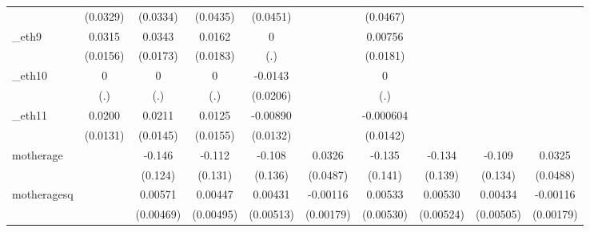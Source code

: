 \begin{table}[htbp]
\begin{tabular}{l*{9}{c}}
            &    (0.0329)         &    (0.0334)         &    (0.0435)         &    (0.0451)         &                     &    (0.0467)         &                     &                     &                     \\
[1em]
\_eth9       &      0.0315\sym{**} &      0.0343\sym{**} &      0.0162         &           0         &                     &     0.00756         &                     &                     &                     \\
            &    (0.0156)         &    (0.0173)         &    (0.0183)         &         (.)         &                     &    (0.0181)         &                     &                     &                     \\
[1em]
\_eth10      &           0         &           0         &           0         &     -0.0143         &                     &           0         &                     &                     &                     \\
            &         (.)         &         (.)         &         (.)         &    (0.0206)         &                     &         (.)         &                     &                     &                     \\
[1em]
\_eth11      &      0.0200         &      0.0211         &      0.0125         &    -0.00890         &                     &   -0.000604         &                     &                     &                     \\
            &    (0.0131)         &    (0.0145)         &    (0.0155)         &    (0.0132)         &                     &    (0.0142)         &                     &                     &                     \\
[1em]
motherage   &                     &      -0.146         &      -0.112         &      -0.108         &      0.0326         &      -0.135         &      -0.134         &      -0.109         &      0.0325         \\
            &                     &     (0.124)         &     (0.131)         &     (0.136)         &    (0.0487)         &     (0.141)         &     (0.139)         &     (0.134)         &    (0.0488)         \\
[1em]
motheragesq &                     &     0.00571         &     0.00447         &     0.00431         &    -0.00116         &     0.00533         &     0.00530         &     0.00434         &    -0.00116         \\
            &                     &   (0.00469)         &   (0.00495)         &   (0.00513)         &   (0.00179)         &   (0.00530)         &   (0.00524)         &   (0.00505)         &   (0.00179)         \\

\end{tabular}
\end{table}
